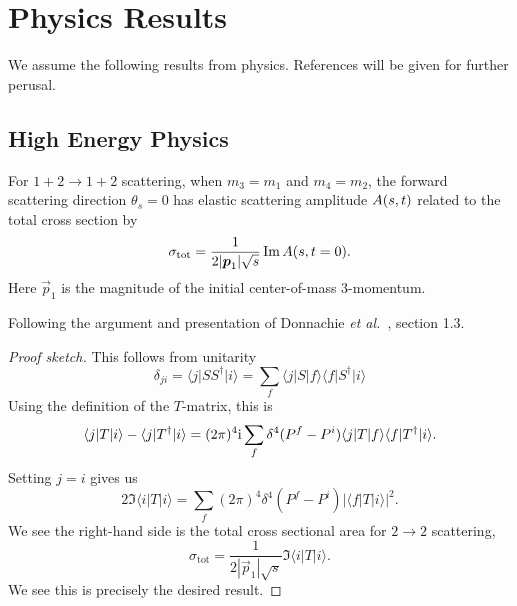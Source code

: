 \chapter{Physics Results}

\M We assume the following results from physics.
References will be given for further perusal.


\section{High Energy Physics}

\begin{theorem}
  For $1+2\to1+2$ scattering, when $m_{3}=m_{1}$ and $m_{4}=m_{2}$,
  the forward scattering direction
  $\theta_{s}=0$ has elastic scattering amplitude $A(s,t)$
  related to the total cross section by
  \begin{equation}
\sigma_{\text{tot}} = \frac{1}{2|\boldsymbol{p}_{1}|\sqrt{s}}\operatorname{Im}A(s,t=0).
  \end{equation}
  Here $\vec{p}_{1}$ is the magnitude of the initial center-of-mass
  3-momentum.
\end{theorem}

Following the argument and presentation of Donnachie \textit{et al.}~\cite{Donnachie:2002en},
section 1.3.

\begin{proof}[Proof sketch]
  This follows from unitarity
  \begin{equation}
    \delta_{ji} = \langle j\vert SS^{\dagger}\vert i\rangle
    = \sum_{f}\langle j\vert S\vert f\rangle\langle f\vert S^{\dagger}\vert i\rangle
  \end{equation}
  Using the definition of the $T$-matrix, this is
  \begin{equation}
\langle j\vert T\vert i\rangle - \langle j\vert T^{\dagger}\vert i\rangle
= (2\pi)^{4}\mathrm{i}\sum_{f}\delta^{4}(P^{f}-P^{i})\langle j\vert T\vert f\rangle\langle f\vert T^{\dagger}\vert i\rangle.
  \end{equation}
  Setting $j=i$ gives us
  \begin{equation}
2\Im\langle i\vert T\vert i\rangle
=\sum_{f}(2\pi)^{4}\delta^{4}(P^{f}-P^{i})|\langle f\vert T\vert i\rangle|^{2}.
  \end{equation}
  We see the right-hand side is the total cross sectional area for
  $2\to2$ scattering,
  \begin{equation}
\sigma_{\text{tot}} = \frac{1}{2|\vec{p}_{1}|\sqrt{s}}\Im\langle i\vert T\vert i\rangle.
  \end{equation}
  We see this is precisely the desired result.
\end{proof}

